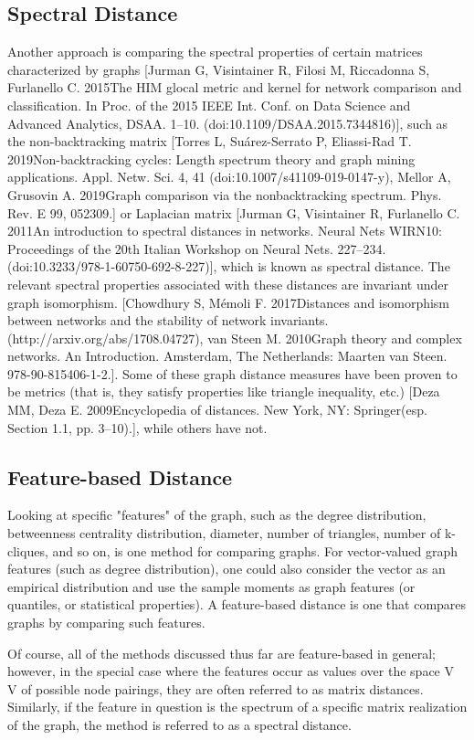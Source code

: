 \subsection{Spectral Distance}
Another approach is comparing the spectral properties of certain matrices characterized by graphs [Jurman G, Visintainer R, Filosi M, Riccadonna S, Furlanello C. 2015The HIM glocal metric and kernel for network comparison and classification. In Proc. of the 2015 IEEE Int. Conf. on Data Science and Advanced Analytics, DSAA. 1–10. (doi:10.1109/DSAA.2015.7344816)], such as the non-backtracking matrix [Torres L, Suárez-Serrato P, Eliassi-Rad T. 2019Non-backtracking cycles: Length spectrum theory and graph mining applications. Appl. Netw. Sci. 4, 41 (doi:10.1007/s41109-019-0147-y), Mellor A, Grusovin A. 2019Graph comparison via the nonbacktracking spectrum. Phys. Rev. E 99, 052309.] or Laplacian matrix [Jurman G, Visintainer R, Furlanello C. 2011An introduction to spectral distances in networks. Neural Nets WIRN10: Proceedings of the 20th Italian Workshop on Neural Nets. 227–234. (doi:10.3233/978-1-60750-692-8-227)], which is known as spectral distance. The relevant spectral properties associated with these distances are invariant under graph isomorphism. [Chowdhury S, Mémoli F. 2017Distances and isomorphism between networks and the stability of network invariants. (http://arxiv.org/abs/1708.04727), van Steen M. 2010Graph theory and complex networks. An Introduction. Amsterdam, The Netherlands: Maarten van Steen. 978-90-815406-1-2.]. Some of these graph distance measures have been proven to be metrics (that is, they satisfy properties like triangle inequality, etc.) [Deza MM, Deza E. 2009Encyclopedia of distances. New York, NY: Springer(esp. Section 1.1, pp. 3–10).], while others have not.

\subsection{Feature-based Distance}
Looking at specific "features" of the graph, such as the degree distribution, betweenness centrality distribution, diameter, number of triangles, number of k-cliques, and so on, is one method for comparing graphs. For vector-valued graph features (such as degree distribution), one could also consider the vector as an empirical distribution and use the sample moments as graph features (or quantiles, or statistical properties). A feature-based distance is one that compares graphs by comparing such features.

Of course, all of the methods discussed thus far are feature-based in general; however, in the special case where the features occur as values over the space V V of possible node pairings, they are often referred to as  matrix distances. Similarly, if the feature in question is the spectrum of a specific matrix realization of the graph, the method is referred to as a spectral distance.


